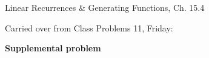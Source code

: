 \documentclass[handout]{mcs}
\begin{document}

\begin{staffnotes}
Linear Recurrences \& Generating Functions, Ch. 15.4
\end{staffnotes}


Carried over from Class Problems 11, Friday:




\iffalse
\begin{center}
\textbf{\large If you didn't finish Problem 1 above last Friday, you
  may not have time to finish the following problem in class.  Be sure
  to study the solution in any case.}
\end{center}
\fi


\begin{center}
\textbf{\large Supplemental problem}
\end{center}




\end{document}
